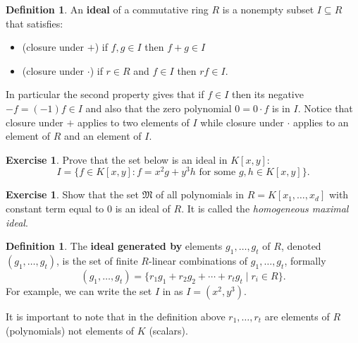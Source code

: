 \documentclass[11pt]{amsart}
\newcommand{\m}{{\mathfrak M}}
\theoremstyle{plain} %
\theoremstyle{definition}
\newtheorem{defn}[thm]{Definition}
\newtheorem{exer}[thm]{Exercise}
\theoremstyle{remark}
\numberwithin{equation}{section}  %
\begin{document}
\begin{tcolorbox}
\begin{defn}\label{def:ideal}
An {\bf ideal} of a commutative ring $R$ is a nonempty subset $I\subseteq R$ that satisfies:
\begin{itemize}
\item (closure under $+$) if $f,g \in I$ then $f+g\in I$
\item (closure under $\cdot$) if $r\in R$ and $f\in I$ then $rf\in I$. 
\end{itemize}
\end{defn}
\end{tcolorbox}
In particular the second property gives that if $f\in I$ then its negative $-f=(-1)f\in I$ and also that the zero polynomial $0=0\cdot f$ is in $I$. 
Notice that closure under $+$ applies to two elements of $I$ while closure under $\cdot$ applies to an element of $R$ and  an element of $I$.

\begin{tcolorbox}[reset]
\begin{exer}\label{exercise}
Prove that the set below is an ideal in $K[x,y]$:
\[
I=\{f\in K[x,y]: f= x^2g+ y^3h \text{ for some } g,h\in K[x,y]\}.
\]
\end{exer}
\end{tcolorbox}


\begin{tcolorbox}[reset]
\begin{exer}\label{ex: maximal ideal}
Show that the set $\m$ of all polynomials in $R=K[x_1,\ldots, x_d]$ with  constant term equal to 0 is an ideal of $R$. It is called the {\em homogeneous maximal ideal}.
\end{exer}
\end{tcolorbox}

\begin{tcolorbox}
\begin{defn} 
\label{def:gens}
The {\bf ideal generated by} elements $g_1, \ldots, g_t$ of $R$, denoted $(g_1, \ldots, g_t)$, is the set of finite $R$-linear combinations of $g_1, \ldots, g_t$, formally
\[
(g_1, \ldots, g_t)=\{ r_1g_1+r_2g_2+\cdots + r_tg_t \mid r_i\in R\}.
\]
For example, we can write the set $I$ in  as $I=(x^2,y^3)$.
\end{defn}
\end{tcolorbox}
It is important to note that in the definition above $r_1, \ldots, r_t$ are elements of $R$ (polynomials) not elements of $K$ (scalars). %
\end{document}

